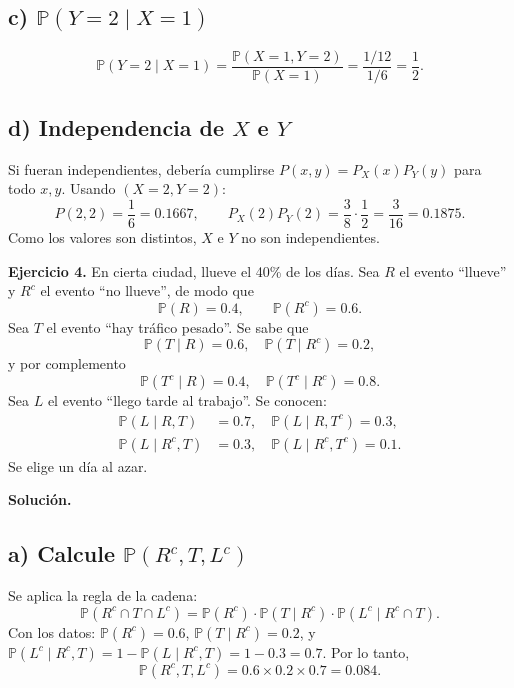 \documentclass[letterpaper, 12pt]{article}
\begin{document}
    \subsection*{c) \(\mathbb{P}(Y = 2 \mid X = 1)\)}
    \[
    \mathbb{P}(Y=2\mid X=1)=\frac{\mathbb{P}(X=1,Y=2)}{\mathbb{P}(X=1)}=\frac{1/12}{1/6}=\frac{1}{2}.
    \]

    \subsection*{d) Independencia de \(X\) e \(Y\)}
    Si fueran independientes, debería cumplirse \(P(x,y)=P_X(x)P_Y(y)\) para todo \(x,y\). 
    Usando \((X=2,Y=2)\):
    \[
    P(2,2)=\frac{1}{6}=0.1667,\qquad P_X(2)P_Y(2)=\frac{3}{8}\cdot\frac{1}{2}=\frac{3}{16}=0.1875.
    \]
    Como los valores son distintos, \(X\) e \(Y\) no son independientes.

    \newpage

    \textbf{Ejercicio 4.} En cierta ciudad, llueve el 40\% de los días. Sea \( R \) el evento “llueve” y \( R^c \) el evento “no llueve”, de modo que  
    \[
    \mathbb{P}(R) = 0.4,\qquad \mathbb{P}(R^c) = 0.6.
    \]  
    Sea \( T \) el evento “hay tráfico pesado”. Se sabe que  
    \[
    \mathbb{P}(T \mid R) = 0.6,\quad \mathbb{P}(T \mid R^c) = 0.2,
    \]  
    y por complemento  
    \[
    \mathbb{P}(T^c \mid R) = 0.4,\quad \mathbb{P}(T^c \mid R^c) = 0.8.
    \]  
    Sea \( L \) el evento “llego tarde al trabajo”. Se conocen:  
    \[
    \begin{aligned}
    \mathbb{P}(L \mid R, T) &= 0.7, \quad \mathbb{P}(L \mid R, T^c) = 0.3,\\
    \mathbb{P}(L \mid R^c, T) &= 0.3, \quad \mathbb{P}(L \mid R^c, T^c) = 0.1.
    \end{aligned}
    \]  
    Se elige un día al azar.

    \textbf{Solución.}

    \subsection*{a) Calcule \(\mathbb{P}(R^c, T, L^c)\)}  
    Se aplica la regla de la cadena:
    \[
    \mathbb{P}(R^c \cap T \cap L^c) = \mathbb{P}(R^c) \cdot \mathbb{P}(T \mid R^c) \cdot \mathbb{P}(L^c \mid R^c \cap T).
    \]  
    Con los datos: \(\mathbb{P}(R^c)=0.6\), \(\mathbb{P}(T \mid R^c)=0.2\), y  
    \(\mathbb{P}(L^c \mid R^c, T) = 1 - \mathbb{P}(L \mid R^c, T) = 1 - 0.3 = 0.7\).  
    Por lo tanto,
    \[
    \mathbb{P}(R^c, T, L^c) = 0.6 \times 0.2 \times 0.7 = 0.084.
    \]
\end{document}
